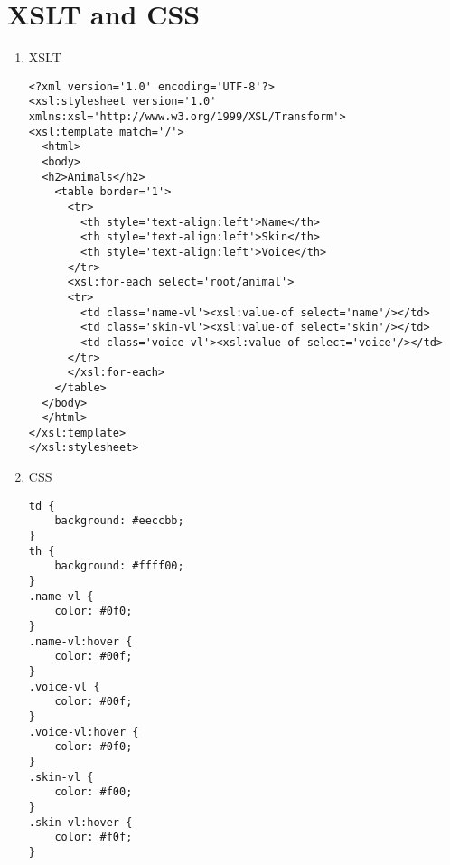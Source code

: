 \documentclass[10pt]{article}
\begin{document}
\section*{XSLT and CSS \\}
\begin{enumerate}
\item XSLT
\begin{verbatim}
<?xml version='1.0' encoding='UTF-8'?>
<xsl:stylesheet version='1.0' xmlns:xsl='http://www.w3.org/1999/XSL/Transform'>
<xsl:template match='/'>
  <html>
  <body>
  <h2>Animals</h2>
    <table border='1'>
      <tr>
        <th style='text-align:left'>Name</th>
        <th style='text-align:left'>Skin</th>
        <th style='text-align:left'>Voice</th>
      </tr>
      <xsl:for-each select='root/animal'>
      <tr>
        <td class='name-vl'><xsl:value-of select='name'/></td>
        <td class='skin-vl'><xsl:value-of select='skin'/></td>
        <td class='voice-vl'><xsl:value-of select='voice'/></td>
      </tr>
      </xsl:for-each>
    </table>
  </body>
  </html>
</xsl:template>
</xsl:stylesheet>
\end{verbatim}

\item CSS
\begin{verbatim}
td {
    background: #eeccbb;
}
th {
    background: #ffff00;  
}
.name-vl {
    color: #0f0;
}
.name-vl:hover {
    color: #00f;
}
.voice-vl {
    color: #00f;
}
.voice-vl:hover {
    color: #0f0;
}
.skin-vl {
    color: #f00;
}
.skin-vl:hover {
    color: #f0f;
}
\end{verbatim}
\end{enumerate} 
\end{document}
